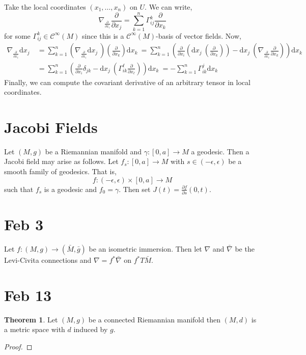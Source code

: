 \documentclass[12pt]{extarticle}
\renewcommand{\d}[1]{ \mathrm{d}#1 \:}
\newcommand{\pderiv}[2]{\frac{\partial{#1}}{\partial{#2}}}
\theoremstyle{definition}
\newtheorem{theorem}{Theorem}[section]
\newcommand{\C}[1]{\mathcal{C}^{#1}}
\begin{document}
Take the local coordinates $(x_1, \dots, x_n)$ on $U$. We can write,
\[ \nabla_{\pderiv{}{x_i}} \pderiv{}{x_j} = \sum_{k = 1}^n \Gamma_{ij}^k \pderiv{}{x_k} \]
for some $\Gamma_{ij}^k \in \C{\infty}(M)$ since this is a $\C{\infty}(M)$-basis of vector fields. Now,
\begin{align*}
\nabla_{\pderiv{}{x_i}} \d{x_j} & = \sum_{k = 1}^n \left( \nabla_{\pderiv{}{x_i}} \d{x_j} \right) \left( \pderiv{}{x_k} \right) \d{x_k} = \sum_{k = 1}^n \left( \pderiv{}{x_i} \left( \d{x_j} \left( \pderiv{}{x_k} \right) \right) - \d{x_j} \left( \nabla_{\pderiv{}{x_i}} \pderiv{}{x_k} \right) \right) \d{x_k}
\\
& =  \sum_{k = 1}^n \left( \pderiv{}{x_i} \delta_{jk} - \d{x_j} \left( \Gamma_{ik}^\ell \pderiv{}{x_\ell} \right) \right) \d{x_k} = - \sum_{k = 1}^n \Gamma_{ik}^j \d{x_k} 
\end{align*}
Finally, we can compute the covariant derivative of an arbitrary tensor in local coordinates.


\section{Jacobi Fields}

Let $(M, g)$ be a Riemannian manifold and $\gamma : [0, a] \to M$ a geodesic. Then a Jacobi field may arise as follows. Let $f_s : [0, a] \to M$ with $s \in (-\epsilon, \epsilon)$ be a smooth family of geodesics. That is,
\[ f : (-\epsilon, \epsilon) \times [0, a] \to M \]
such that $f_s$ is a geodesic and $f_0 = \gamma$. Then set $J(t) = \pderiv{f}{s}(0, t)$. 


\section{Feb 3}

Let $f : (M, g) \to (\bar{M}, \bar{g})$ be an isometric immersion. Then let $\nabla$ and $\bar{\nabla}$ be the Levi-Civita connections and $\nabla = f^* \bar{\nabla}$ on $f^* T\bar{M}$. 


\section{Feb 13}

\begin{theorem}
Let $(M, g)$ be a connected Riemannian manifold then $(M, d)$ is a metric space with $d$ induced by $g$.
\end{theorem}

\begin{proof}

\end{proof}
\end{document}
